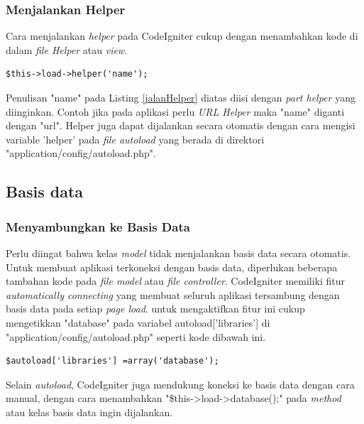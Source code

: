 	\subsubsection{Menjalankan Helper}
	\label{subsub: menjalnkanHelper}
	
	Cara menjalankan \textit{helper} pada CodeIgniter cukup dengan menambahkan kode di dalam \textit{file Helper} atau \textit{view}.
	
	\begin{lstlisting}[caption="Kode Helper", label={jalanHelper}]
$this->load->helper('name');
	\end{lstlisting}
	
	Penulisan "name" pada Listing \ref{jalanHelper} diatas diisi dengan \textit{part helper} yang diinginkan. Contoh jika pada aplikasi perlu \textit{URL Helper} maka "name" diganti dengan "url". Helper juga dapat dijalankan secara otomatis dengan cara mengisi variable 'helper' pada \textit{file autoload} yang berada di direktori "application/config/autoload.php".
	
	\subsection{Basis data}
	\label{sub: database}
	
	\subsubsection{Menyambungkan ke Basis Data}
	\label{subsub: connectDatabase}
	
	Perlu diingat bahwa kelas \textit{model} tidak menjalankan basis data secara otomatis. Untuk membuat aplikasi terkoneksi dengan basis data, diperlukan beberapa tambahan kode pada \textit{file model} atau \textit{file controller}.
	CodeIgniter memiliki fitur \textit{automatically connecting} yang membuat seluruh aplikasi tersambung dengan basis data pada setiap \textit{page load}. untuk mengaktifkan fitur ini cukup mengetikkan "database" pada variabel autoload['libraries'] di "application/config/autoload.php" seperti kode dibawah ini.
	
	\begin{lstlisting}
$autoload['libraries'] =array('database');
	\end{lstlisting}
	
	Selain \textit{autoload}, CodeIgniter juga mendukung koneksi ke basis data dengan cara manual, dengan cara menambahkan "\$this->load->database();" pada \textit{method} atau kelas basis data ingin dijalankan.
	
